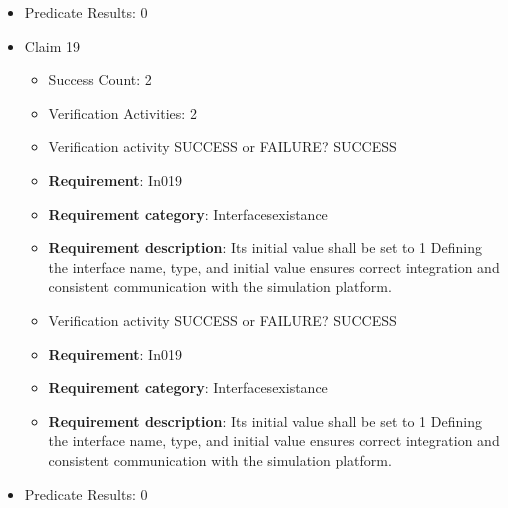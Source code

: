 \documentclass{article}
\begin{document}
\begin{itemize}
\begin{itemize}
					\item Verification activity SUCCESS or FAILURE? SUCCESS
		
						\item \textbf{Requirement}: In018 
						\item \textbf{Requirement category}: Interfacesexistance 
						\item \textbf{Requirement description}: Its initial value shall be set to 0 Defining the interface name, type, and initial value ensures correct integration and consistent communication with the simulation platform.
					
				\end{itemize}
				
									    
				\item Predicate Results: 0

  				  \item Claim 19
				\begin{itemize}
			    	\item Success Count: 2 
			    	\item Verification Activities: 2
					\item Verification activity SUCCESS or FAILURE? SUCCESS
		
						\item \textbf{Requirement}: In019 
						\item \textbf{Requirement category}: Interfacesexistance 
						\item \textbf{Requirement description}: Its initial value shall be set to 1 Defining the interface name, type, and initial value ensures correct integration and consistent communication with the simulation platform.
					
					\item Verification activity SUCCESS or FAILURE? SUCCESS
		
						\item \textbf{Requirement}: In019 
						\item \textbf{Requirement category}: Interfacesexistance 
						\item \textbf{Requirement description}: Its initial value shall be set to 1 Defining the interface name, type, and initial value ensures correct integration and consistent communication with the simulation platform.
					
				\end{itemize}
				
									    
				\item Predicate Results: 0


\end{itemize}
\end{document}
